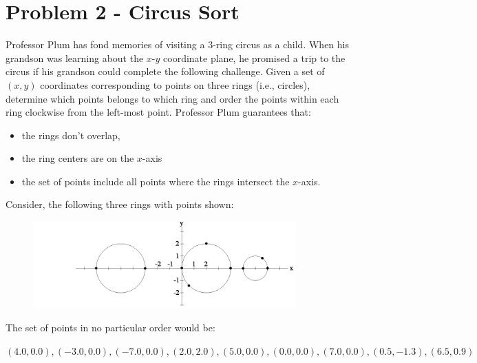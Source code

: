 \documentclass{article}
\begin{document}

\section*{Problem 2 - Circus Sort}

Professor Plum has fond memories of visiting a $3$-ring circus as a child.  When his grandson was learning about the $x$-$y$ coordinate plane, he promised a trip to the circus if his grandson could complete the following challenge.  Given a set of $(x, y)$ coordinates corresponding to points on three rings (i.e., circles), determine which points belongs to which ring and order the points within each ring clockwise from the left-most point.  Professor Plum guarantees that:
\begin{itemize}
\itemsep 0in
\item the rings don’t overlap,
\item the ring centers are on the $x$-axis
\item the set of points include all points where the rings intersect the $x$-axis.  
\end{itemize}
Consider, the following three rings with points shown: \\

\begin{figure}[h]
\begin{center}
\includegraphics[width=0.9\textwidth]{problem2circle.png} 
\end{center}
\end{figure}

The set of points in no particular order would be:
\begin{center}
\begin{math}
(4.0, 0.0), (-3.0, 0.0), (-7.0, 0.0), (2.0, 2.0), (5.0, 0.0), (0.0, 0.0) , (7.0, 0.0), (0.5, -1.3), (6.5, 0.9)
\end{math}
\end{center}
\end{document}
